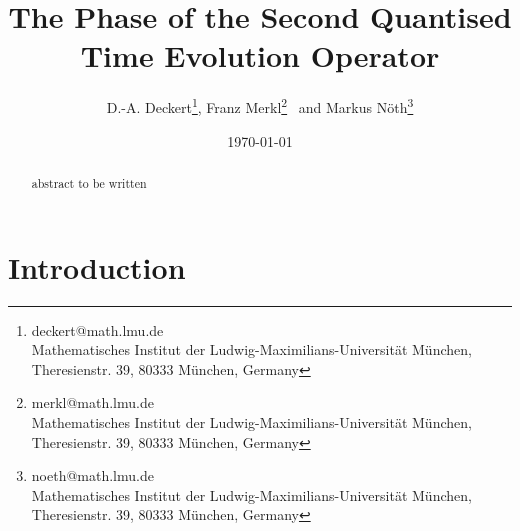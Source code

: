 \documentclass[a4paper,11pt]{article}
\begin{document}
\title{The Phase of the Second Quantised Time Evolution Operator}

\author{
D.-A. Deckert\thanks{deckert@math.lmu.de \\ \tiny{Mathematisches Institut der Ludwig-Maximilians-Universit\"at M\"unchen,}
    \tiny{Theresienstr. 39, 80333 M\"unchen, Germany}},
Franz Merkl\thanks{merkl@math.lmu.de \\     \tiny{Mathematisches Institut der Ludwig-Maximilians-Universit\"at M\"unchen,}
    \tiny{Theresienstr. 39, 80333 M\"unchen, Germany}}
	 ~and
Markus Nöth\thanks{noeth@math.lmu.de \\\tiny{Mathematisches Institut der Ludwig-Maximilians-Universit\"at M\"unchen,}
    \tiny{Theresienstr. 39, 80333 M\"unchen, Germany}}

}
\date{\today}



\maketitle

\begin{abstract}
abstract to be written
\end{abstract}

\section{Introduction}
\end{document}
